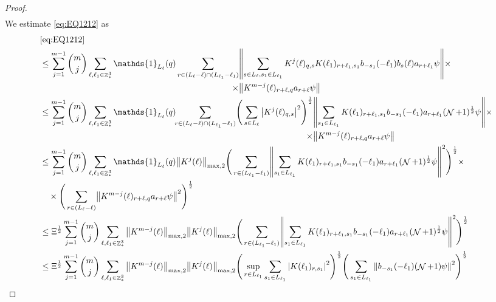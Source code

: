 \documentclass[sn-mathphys, Numbered ,a4paper]{sn-jnl}%
\DeclareMathOperator{\Z}{\mathbb{Z}}
\DeclareMathOperator{\NN}{\mathcal{N}}
\newcommand{\half}{\frac{1}{2}}
\theoremstyle{plain}
\theoremstyle{definition}
\theoremstyle{remark}
\theoremstyle{plain}
\theoremstyle{definition}
\theoremstyle{remark}
\begin{document}
{\begin{proof}
\begin{align}
\end{align}
We estimate \eqref{eq:EQ1212} as 
\begin{alignat}{2}
	&\eqref{eq:EQ1212}\nonumber\\
	&\leq \sum\limits_{j=1}^{m-1} {{m}\choose j} \sum\limits_{\ell, \ell_1\in \Z^3_*} \mathds{1}_{L_{\ell}}(q)\, \begin{aligned}[t]
	\sum\limits_{r\in (L_{\ell}-\ell) \cap (L_{\ell_1}-\ell_1)} &\norm{ \sum\limits_{s \in L_\ell, s_1 \in L_{\ell_1}} K^{j}(\ell)_{q,s} K(\ell_1)_{r+\ell_1,s_1} b_{-s_1}(-\ell_1) b_{s}(\ell) a_{r+\ell_1}\psi}\times\nonumber\\\times&\norm{  K^{m-j}(\ell)_{r+\ell,q} a_{r+\ell} \psi }
	\end{aligned} \nonumber\\
	&\leq \sum\limits_{j=1}^{m-1} {{m}\choose j} \sum\limits_{\ell, \ell_1\in \Z^3_*} \mathds{1}_{L_{\ell}}(q)\!\! \sum\limits_{r\in (L_{\ell}-\ell) \cap (L_{\ell_1}-\ell_1)}\! \Bigg( \sum\limits_{s \in L_\ell}\begin{aligned}[t]
		\abs{K^{j}(\ell)_{q,s}}^2\Bigg)^\half &\norm{ \sum\limits_{ s_1 \in L_{\ell_1}}  K(\ell_1)_{r+\ell_1,s_1} b_{-s_1}(-\ell_1)  a_{r+\ell_1}(\NN+1)^\half\psi}\times\nonumber\\ \times&\norm{  K^{m-j}(\ell)_{r+\ell,q} a_{r+\ell} \psi }
	\end{aligned} \nonumber\\
	&\leq \sum\limits_{j=1}^{m-1} {{m}\choose j} \sum\limits_{\ell, \ell_1\in \Z^3_*} \mathds{1}_{L_{\ell}}(q) \norm{K^{j}(\ell)}_{\mathrm{max,2}} \Bigg( \sum\limits_{r\in  (L_{\ell_1}-\ell_1)}\! \norm{ \sum\limits_{ s_1 \in L_{\ell_1}}  K(\ell_1)_{r+\ell_1,s_1} b_{-s_1}(-\ell_1)  a_{r+\ell_1} (\NN+1)^\half\psi} ^2\Bigg)^\half \times\nonumber\\ &\quad\times\Bigg( \sum\limits_{r\in (L_{\ell}-\ell) }\!\norm{  K^{m-j}(\ell)_{r+\ell,q} a_{r+\ell} \psi }^2\Bigg)^\half\nonumber\\
	&\leq \Xi^\half \sum\limits_{j=1}^{m-1} {{m}\choose j} \sum\limits_{\ell, \ell_1\in \Z^3_*} \norm{K^{m-j}(\ell)}_{\mathrm{max,2}} \norm{K^{j}(\ell)}_{\mathrm{max,2}} \Bigg( \sum\limits_{r\in (L_{\ell_1}-\ell_1)}\! \norm{ \sum\limits_{ s_1 \in L_{\ell_1}}  K(\ell_1)_{r+\ell_1,s_1} b_{-s_1}(-\ell_1)  a_{r+\ell_1} (\NN+1)^\half\psi} ^2\Bigg)^\half \nonumber\\
	&\leq \Xi^\half \sum\limits_{j=1}^{m-1} {{m}\choose j} \sum\limits_{\ell, \ell_1\in \Z^3_*} \norm{K^{m-j}(\ell)}_{\mathrm{max,2}} \norm{K^{j}(\ell)}_{\mathrm{max,2}} \Bigg(\sup_{r \in L_{\ell_1}} \sum\limits_{ s_1 \in L_{\ell_1}}\abs{  K(\ell_1)_{r,s_1} }^2\Bigg)^\half \Bigg(  \sum\limits_{ s_1 \in L_{\ell_1}}\norm{   b_{-s_1}(-\ell_1)  (\NN+1)\psi} ^2\Bigg)^\half \nonumber\\

\end{alignat}
\end{proof}}
\end{document}
